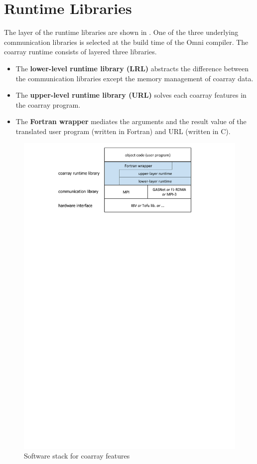 \section{Runtime Libraries}\label{sec:runtime}

The layer of the runtime libraries are shown in .
One of the three underlying communication libraries is selected 
at the build time of the Omni compiler.
The coarray runtime consists of layered three libraries.
\begin{itemize}
\item
The {\bf lower-level runtime library (LRL)} abstracts the difference between 
the communication libraries except the memory management of coarray data.
\item
The {\bf upper-level runtime library (URL)} solves each coarray features 
in the coarray program.
\item
The {\bf Fortran wrapper} mediates the arguments and the result value 
of the translated user program (written in Fortran) and URL (written in C).
\end{itemize}


\begin{figure}[tbh]
  \begin{center}
    \mbox{\includegraphics[trim=27mm 208mm 29mm 0mm, scale=0.7,clip]{figs/softstack-r4.pdf}}
    \caption{Software stack for coarray features}\label{fig:layer}
  \end{center}
\end{figure}



